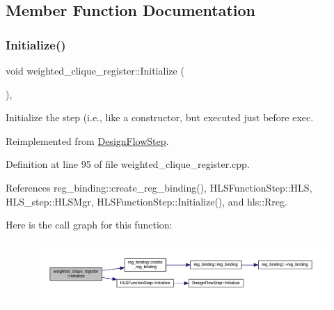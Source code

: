 \subsection{Member Function Documentation}
\mbox{\label{classweighted__clique__register_a1f6d70de6fafd41bf34a6b9360a57c2b}} 
\subsubsection{\texorpdfstring{Initialize()}{Initialize()}}
{\footnotesize\ttfamily void weighted\+\_\+clique\+\_\+register\+::\+Initialize (\begin{DoxyParamCaption}{ }\end{DoxyParamCaption})\hspace{0.3cm}{\ttfamily [override]}, {\ttfamily [virtual]}}



Initialize the step (i.\+e., like a constructor, but executed just before exec. 



Reimplemented from \hyperlink{classDesignFlowStep_a44b50683382a094976e1d432a7784799}{Design\+Flow\+Step}.



Definition at line 95 of file weighted\+\_\+clique\+\_\+register.\+cpp.



References reg\+\_\+binding\+::create\+\_\+reg\+\_\+binding(), H\+L\+S\+Function\+Step\+::\+H\+LS, H\+L\+S\+\_\+step\+::\+H\+L\+S\+Mgr, H\+L\+S\+Function\+Step\+::\+Initialize(), and hls\+::\+Rreg.

Here is the call graph for this function\+:
\nopagebreak
\begin{figure}[H]
\begin{center}
\leavevmode
\includegraphics[width=350pt]{dd/dd9/classweighted__clique__register_a1f6d70de6fafd41bf34a6b9360a57c2b_cgraph}
\end{center}
\end{figure}
\mbox{\label{classweighted__clique__register_a9c11748ba96df1f9d36792ec41f1f377}} 
